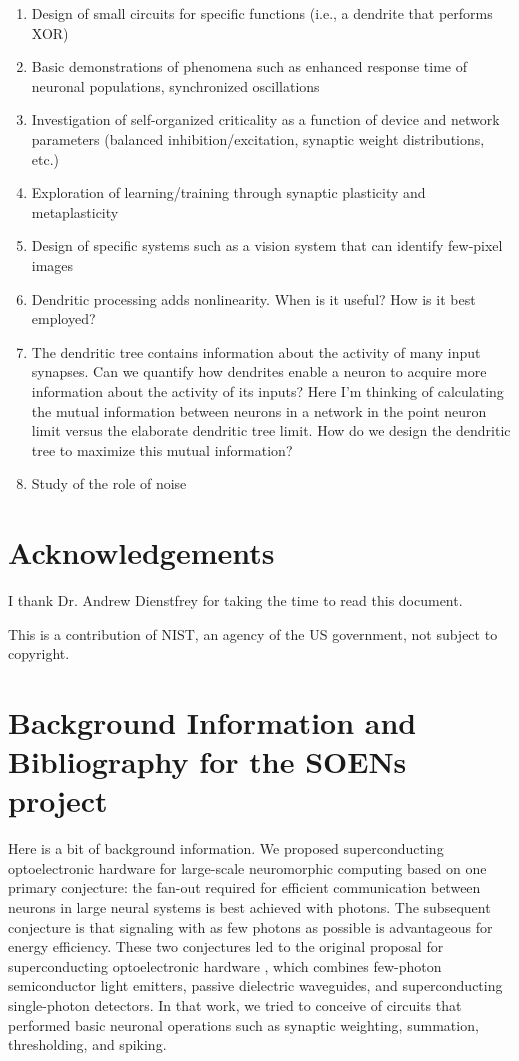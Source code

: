 \documentclass[]{article}
\begin{document}
\begin{enumerate}
\item Design of small circuits for specific functions (i.e., a dendrite that performs XOR)
\item Basic demonstrations of phenomena such as enhanced response time of neuronal populations, synchronized oscillations
\item Investigation of self-organized criticality as a function of device and network parameters (balanced inhibition/excitation, synaptic weight distributions, etc.)
\item Exploration of learning/training through synaptic plasticity and metaplasticity
\item Design of specific systems such as a vision system that can identify few-pixel images
\item Dendritic processing adds nonlinearity. When is it useful? How is it best employed?
\item The dendritic tree contains information about the activity of many input synapses. Can we quantify how dendrites enable a neuron to acquire more information about the activity of its inputs? Here I'm thinking of calculating the mutual information between neurons in a network in the point neuron limit versus the elaborate dendritic tree limit. How do we design the dendritic tree to maximize this mutual information?
\item Study of the role of noise
\end{enumerate}

\section{Acknowledgements}
I thank Dr. Andrew Dienstfrey for taking the time to read this document.

\vspace{0.5em}
\noindent This is a contribution of NIST, an agency of the US government, not subject to copyright.
	
\newpage
\appendix

\section{\label{sec:background}Background Information and Bibliography for the SOENs project}
Here is a bit of background information. We proposed superconducting optoelectronic hardware for large-scale neuromorphic computing based on one primary conjecture: the fan-out required for efficient communication between neurons in large neural systems is best achieved with photons. The subsequent conjecture is that signaling with as few photons as possible is advantageous for energy efficiency. These two conjectures led to the original proposal for superconducting optoelectronic hardware \cite{shbu2017}, which combines few-photon semiconductor light emitters, passive dielectric waveguides, and superconducting single-photon detectors. In that work, we tried to conceive of circuits that performed basic neuronal operations such as synaptic weighting, summation, thresholding, and spiking. 
\end{document}
